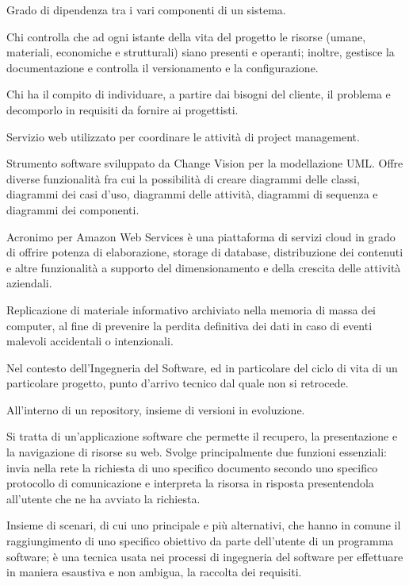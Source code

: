 \item[accoppiamento] Grado di dipendenza tra i vari componenti di un sistema.
\item[amministratore di progetto] Chi controlla che ad ogni istante della vita del progetto le risorse (umane, materiali, economiche e strutturali) siano presenti e operanti; inoltre, gestisce la documentazione e controlla il versionamento e la configurazione.
\item[analista] Chi ha il compito di individuare, a partire dai bisogni del cliente, il problema e decomporlo in requisiti da fornire ai progettisti.
\item[Asana] Servizio web utilizzato per coordinare le attività di project management.
\item[Astah] Strumento software sviluppato da Change Vision per la modellazione UML. Offre diverse funzionalità fra cui la possibilità di creare diagrammi delle classi, diagrammi dei casi d’uso, diagrammi delle attività, diagrammi di sequenza e diagrammi dei componenti.
\item[AWS] Acronimo per Amazon Web Services è una piattaforma di servizi cloud in grado di offrire potenza di elaborazione, storage di database, distribuzione dei contenuti e altre funzionalità a supporto del dimensionamento e della crescita delle attività aziendali.
\item[backup] Replicazione di materiale informativo archiviato nella memoria di massa dei computer, al fine di prevenire la perdita definitiva dei dati in caso di eventi malevoli accidentali o intenzionali.
\item[baseline] Nel contesto dell'Ingegneria del Software, ed in particolare del ciclo di vita di un particolare progetto, punto d'arrivo tecnico dal quale non si retrocede.
\item[branch] All'interno di un repository, insieme di versioni in evoluzione.
\item[browser] Si tratta di un’applicazione software che permette il recupero, la presentazione e la navigazione di risorse su web. Svolge principalmente due funzioni essenziali: invia nella rete la richiesta di uno specifico documento secondo uno specifico protocollo di comunicazione e interpreta la risorsa in risposta presentendola all’utente che ne ha avviato la richiesta.
\item[caso d'uso] Insieme di scenari, di cui uno principale e più alternativi, che hanno in comune il raggiungimento di uno specifico obiettivo da parte dell'utente di un programma software; è una tecnica usata nei processi di ingegneria del software per effettuare in maniera esaustiva e non ambigua, la raccolta dei requisiti.
